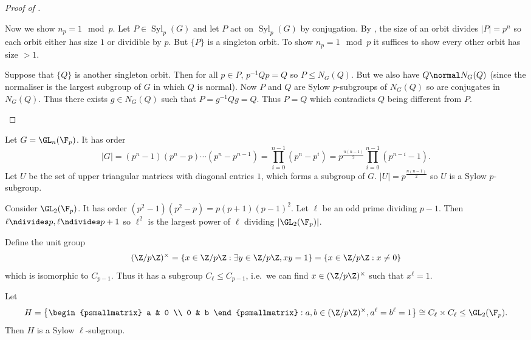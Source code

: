 \documentclass[a4paper]{article}
\theoremstyle{definition}
\DeclareMathOperator{\syl}{Syl}
\begin{document}
\begin{proof}[Proof of ]
\begin{enumerate}
    Now we show \(n_p = 1 \mod p\). Let \(P \in \syl_p(G)\) and let \(P\) act on \(\syl_p(G)\) by conjugation. By , the size of an orbit divides \(|P| = p^n\) so each orbit either has size \(1\) or dividible by \(p\). But \(\{P\}\) is a singleton orbit. To show \(n_p = 1 \mod p\) it suffices to show every other orbit has size \(> 1\).

    Suppose that \(\{Q\}\) is another singleton orbit. Then for all \(p \in P\), \(p^{-1}Qp = Q\) so \(P \leq N_G(Q)\). But we also have \(Q \normal N_G(Q)\) (since the normaliser is the largest subgroup of \(G\) in which \(Q\) is normal). Now \(P\) and \(Q\) are Sylow \(p\)-subgroups of \(N_G(Q)\) so are conjugates in \(N_G(Q)\). Thus there exists \(g \in N_G(Q)\) such that \(P = g^{-1}Qg = Q\). Thus \(P = Q\) which contradicts \(Q\) being different from \(P\).
  \end{enumerate}
\end{proof}

\begin{eg}
  Let \(G = \GL_n(\F_p)\). It has order
  \[
    |G| = (p^n - 1)(p^n - p) \cdots (p^n - p^{n - 1}) = \prod_{i = 0}^{n - 1} (p^n - p^i) = p^{\frac{n(n-1)}{2}} \prod_{i = 0}^{n - 1} (p^{n - i} - 1).
  \]
  Let \(U\) be the set of upper triangular matrices with diagonal entries \(1\), which forms a subgroup of \(G\). \(|U| = p^{\frac{n(n - 1)}{2}}\) so \(U\) is a Sylow \(p\)-subgroup.
    
  Consider \(\GL_2(\F_p)\). It has order \((p^2 - 1)(p^2 - p) = p(p + 1)(p - 1)^2\). Let \(\ell\) be an odd prime dividing \(p - 1\). Then \(\ell \ndivides p, \ell \ndivides p + 1\) so \(\ell^2\) is the largest power of \(\ell\) dividing \(|\GL_2(\F_p)|\).

  Define the unit group
  \[
    (\Z/p\Z)^\times = \{x \in \Z/p\Z: \exists y \in \Z/p\Z, xy = 1\} = \{x \in \Z/p\Z: x \neq 0\}
  \]
  which is isomorphic to \(C_{p - 1}\). Thus it has a subgroup \(C_\ell \leq C_{p - 1}\), i.e.\ we can find \(x \in (\Z/p\Z)^\times\) such that \(x^\ell = 1\).

  Let
  \[
    H = \left\{
      \begin{psmallmatrix}
        a & 0 \\
        0 & b
      \end{psmallmatrix}
      : a, b \in (\Z/p\Z)^\times, a^\ell = b^\ell = 1 \right\}
    \cong C_\ell \times C_\ell \leq \GL_2(\F_p).
  \]
  Then \(H\) is a Sylow \(\ell\)-subgroup.
\end{eg}
\end{document}
